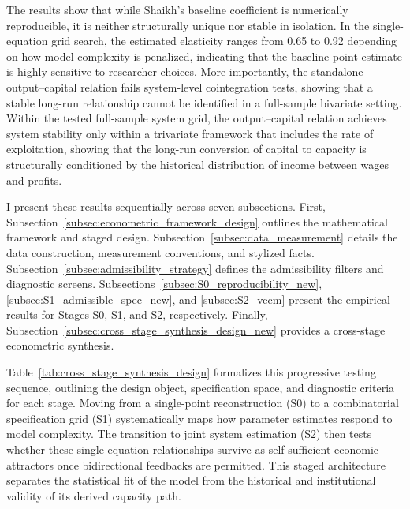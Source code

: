 The results show that while Shaikh's baseline coefficient is numerically reproducible, it is neither structurally unique nor stable in isolation. In the single-equation grid search, the estimated elasticity ranges from 0.65 to 0.92 depending on how model complexity is penalized, indicating that the baseline point estimate is highly sensitive to researcher choices. More importantly, the standalone output--capital relation fails system-level cointegration tests, showing that a stable long-run relationship cannot be identified in a full-sample bivariate setting. Within the tested full-sample system grid, the output--capital relation achieves system stability only within a trivariate framework that includes the rate of exploitation, showing that the long-run conversion of capital to capacity is structurally conditioned by the historical distribution of income between wages and profits.

I present these results sequentially across seven subsections. First, Subsection~\ref{subsec:econometric_framework_design} outlines the mathematical framework and staged design. Subsection~\ref{subsec:data_measurement} details the data construction, measurement conventions, and stylized facts. Subsection~\ref{subsec:admissibility_strategy} defines the admissibility filters and diagnostic screens. Subsections~\ref{subsec:S0_reproducibility_new}, \ref{subsec:S1_admissible_spec_new}, and \ref{subsec:S2_vecm} present the empirical results for Stages S0, S1, and S2, respectively. Finally, Subsection~\ref{subsec:cross_stage_synthesis_design_new} provides a cross-stage econometric synthesis.

Table~\ref{tab:cross_stage_synthesis_design} formalizes this progressive testing sequence, outlining the design object, specification space, and diagnostic criteria for each stage. Moving from a single-point reconstruction (S0) to a combinatorial specification grid (S1) systematically maps how parameter estimates respond to model complexity. The transition to joint system estimation (S2) then tests whether these single-equation relationships survive as self-sufficient economic attractors once bidirectional feedbacks are permitted. This staged architecture separates the statistical fit of the model from the historical and institutional validity of its derived capacity path.

